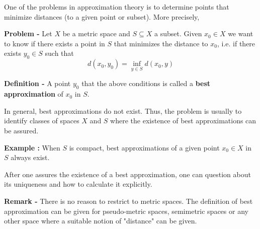 \documentclass[12pt]{article}
\begin{document}
One of the  problems in approximation theory is to determine points that minimize distances (to a given point or subset). More precisely,

{\bf Problem -} Let $X$ be a metric space and $S \subseteq X$ a subset. Given $x_0 \in X$ we want to know if there exists a point in $S$ that minimizes the distance to $x_0$, i.e. if there exists $y_0 \in S$ such that
\begin{displaymath}
d(x_0,y_0)=\inf_{y \in S}d(x_0,y)
\end{displaymath}

{\bf Definition -} A point $y_0$ that  the above conditions is called a {\bf best approximation} of $x_0$ in $S$.

In general, best approximations do not exist. Thus, the problem is usually to identify classes of spaces $X$ and $S$ where the existence of best approximations can be assured.

{\bf Example :} When $S$ is compact, best approximations of a given point $x_0 \in X$ in $S$ always exist.

After one assures the existence of a best approximation, one can question about its uniqueness and how to calculate it explicitly.

{\bf Remark -} There is no reason to restrict to metric spaces. The definition of best approximation can be given for pseudo-metric spaces, semimetric spaces or any other space where a suitable notion of "distance" can be given.
\end{document}
